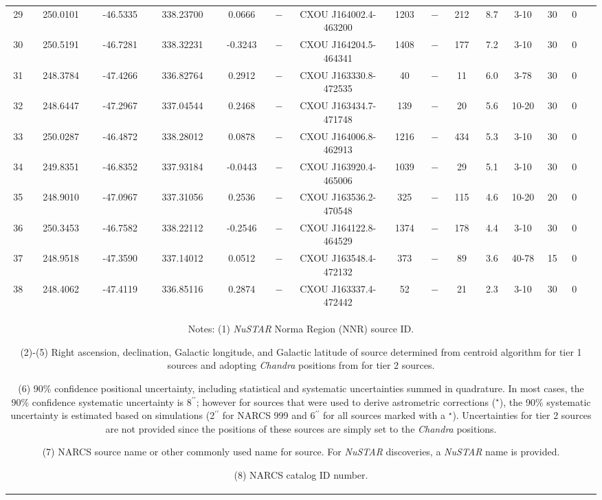 \documentclass[iop,revtex4]{emulateapj}
\newcommand\T{\rule{0pt}{2.6ex}}       %
\newcommand\B{\rule[-1.2ex]{0pt}{0pt}} %
\newcommand\M{\rule{0pt}{2.3ex}}
\begin{document}
\begin{landscape}
{\begin{longtable}{ccccccccccccccl}
\M 29&250.0101&-46.5335&338.23700&0.0666&$-$&CXOU J164002.4-463200&1203&$-$&212&8.7&3-10&30&0\\
\M 30&250.5191&-46.7281&338.32231&-0.3243&$-$&CXOU J164204.5-464341&1408&$-$&177&7.2&3-10&30&0\\
\M 31&248.3784&-47.4266&336.82764&0.2912&$-$&CXOU J163330.8-472535&40&$-$&11&6.0&3-78&30&0\\
\M 32&248.6447&-47.2967&337.04544&0.2468&$-$&CXOU J163434.7-471748&139&$-$&20&5.6&10-20&30&0\\
\M 33&250.0287&-46.4872&338.28012&0.0878&$-$&CXOU J164006.8-462913&1216&$-$&434&5.3&3-10&30&0\\
\M 34&249.8351&-46.8352&337.93184&-0.0443&$-$&CXOU J163920.4-465006&1039&$-$&29&5.1&3-10&30&0\\
\M 35&248.9010&-47.0967&337.31056&0.2536&$-$&CXOU J163536.2-470548&325&$-$&115&4.6&10-20&20&0\\
\M 36&250.3453&-46.7582&338.22112&-0.2546&$-$&CXOU J164122.8-464529&1374&$-$&178&4.4&3-10&30&0\\
\M 37&248.9518&-47.3590&337.14012&0.0512&$-$&CXOU J163548.4-472132&373&$-$&89&3.6&40-78&15&0\\
\M \B 38&248.4062&-47.4119&336.85116&0.2874&$-$&CXOU J163337.4-472442&52&$-$&21&2.3&3-10&30&0\\
\hline\hline
\multicolumn{15}{p{7.0in}}{\T Notes: (1) \textit{NuSTAR} Norma Region (NNR) source ID. 

(2)-(5) Right ascension, declination, Galactic longitude, and Galactic latitude of source determined from centroid algorithm for tier 1 sources and adopting \textit{Chandra} positions from \citet{fornasini14} for tier 2 sources. 

(6) 90\% confidence positional uncertainty, including statistical and systematic uncertainties summed in quadrature.  In most cases, the 90\% confidence systematic uncertainty is 8$^{\prime\prime}$; however for sources that were used to derive astrometric corrections ($^{\star}$), the 90\% systematic uncertainty is estimated based on simulations (2$^{\prime\prime}$ for NARCS 999 and 6$^{\prime\prime}$ for all sources marked with a $^{\star}$).  Uncertainties for tier 2 sources are not provided since the positions of these sources are simply set to the \textit{Chandra} positions.  

(7) NARCS source name or other commonly used name for source.  For \textit{NuSTAR} discoveries, a \textit{NuSTAR} name is provided.  

(8) NARCS catalog ID number. 

}
\end{longtable}}
\end{landscape}
\end{document}
